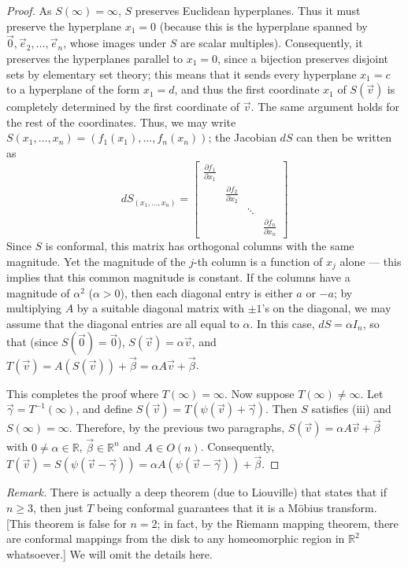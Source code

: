 \documentclass[leqno]{book}
\begin{document}
\begin{proof}
As $S(\infty)=\infty$, $S$ preserves Euclidean hyperplanes.  Thus it must preserve the hyperplane $x_1=0$ (because this is the hyperplane spanned by $\vec 0,\vec e_2,\dots,\vec e_n$, whose images under $S$ are scalar multiples).  Consequently, it preserves the hyperplanes parallel to $x_1=0$, since a bijection preserves disjoint sets by elementary set theory; this means that it sends every hyperplane $x_1=c$ to a hyperplane of the form $x_1=d$, and thus the first coordinate $x_1$ of $S(\vec v)$ is completely determined by the first coordinate of $\vec v$.  The same argument holds for the rest of the coordinates.  Thus, we may write $S(x_1,\dots,x_n)=(f_1(x_1),\dots,f_n(x_n))$; the Jacobian $dS$ can then be written as
$$dS_{(x_1,\dots,x_n)}=\begin{bmatrix}\frac{\partial f_1}{\partial x_1}\\&\frac{\partial f_2}{\partial x_2}\\&&\ddots\\&&&\frac{\partial f_n}{\partial x_n}\end{bmatrix}$$
Since $S$ is conformal, this matrix has orthogonal columns with the same magnitude.  Yet the magnitude of the $j$-th column is a function of $x_j$ alone \---- this implies that this common magnitude is constant.  If the columns have a magnitude of $\alpha^2$ ($\alpha>0$), then each diagonal entry is either $a$ or $-a$; by multiplying $A$ by a suitable diagonal matrix with $\pm 1$'s on the diagonal, we may assume that the diagonal entries are all equal to $\alpha$.  In this case, $dS=\alpha I_n$, so that (since $S(\vec 0)=\vec 0$), $S(\vec v)=\alpha\vec v$, and $T(\vec v)=A(S(\vec v))+\vec\beta=\alpha A\vec v+\vec\beta$.

This completes the proof where $T(\infty)=\infty$.  Now suppose $T(\infty)\ne\infty$.  Let $\vec\gamma=T^{-1}(\infty)$, and define $S(\vec v)=T(\psi(\vec v)+\vec\gamma)$.  Then $S$ satisfies (iii) and $S(\infty)=\infty$.  Therefore, by the previous two paragraphs, $S(\vec v)=\alpha A\vec v+\vec\beta$ with $0\ne\alpha\in\mathbb R$, $\vec\beta\in\mathbb R^n$ and $A\in O(n)$.  Consequently, $T(\vec v)=S(\psi(\vec v-\vec\gamma))=\alpha A(\psi(\vec v-\vec\gamma))+\vec\beta$.
\end{proof}

\noindent\emph{Remark.} There is actually a deep theorem (due to Liouville) that states that if $n\geqslant 3$, then just $T$ being conformal guarantees that it is a M\"obius transform.  [This theorem is false for $n=2$; in fact, by the Riemann mapping theorem, there are conformal mappings from the disk to any homeomorphic region in $\mathbb R^2$ whatsoever.]  We will omit the details here.\\
\end{document}
